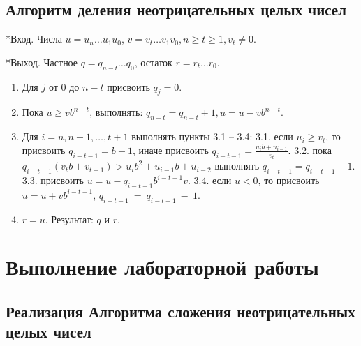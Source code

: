 \documentclass[
  english,
  russian,
  12pt,
  a4paper,
  DIV=11,
  numbers=noendperiod]{scrreprt}
\providecommand{\tightlist}{%
  \setlength{\itemsep}{0pt}\setlength{\parskip}{0pt}}
\begin{document}
\section{Алгоритм деления неотрицательных целых
чисел}\label{ux430ux43bux433ux43eux440ux438ux442ux43c-ux434ux435ux43bux435ux43dux438ux44f-ux43dux435ux43eux442ux440ux438ux446ux430ux442ux435ux43bux44cux43dux44bux445-ux446ux435ux43bux44bux445-ux447ux438ux441ux435ux43b}

*Вход. Числа \(u = u_n \ldots u_1 u_0\),
\(v = v_t \ldots v_1 v_0, n \ge t \ge 1, v_t \ne 0\).

*Выход. Частное \(q = q_{n-t} \ldots q_0\), остаток
\(r = r_t \ldots r_0\).

\begin{enumerate}
\def\labelenumi{\arabic{enumi}.}
\tightlist
\item
  Для \(j\) от \(0\) до \(n - t\) присвоить \(q_j = 0\).
\item
  Пока \(u \ge v b^{n - t}\), выполнять:
  \(q_{n - t} = q_{n - t} + 1, u = u - v b^{n - t}\).
\item
  Для \(i = n, n - 1, \ldots, t + 1\) выполнять пункты 3.1 -- 3.4: 3.1.
  если \(u_i \ge v_t\), то присвоить \(q_{i - t - 1} = b - 1\), иначе
  присвоить \(q_{i - t - 1} = \frac{u_i b + u_{i - 1}}{v_t}\). 3.2. пока
  \(q_{i - t - 1} (v_t b + v_{t - 1}) > u_i b^2 + u_{i - 1} b + u_{i - 2}\)
  выполнять \(q_{i - t - 1} = q_{i - t - 1} - 1\). 3.3. присвоить
  \(u = u - q_{i - t - 1} b^{i - t - 1} v\). 3.4. если \(u < 0\), то
  присвоить \(u = u + v b^{i - t - 1}\),
  \(q_{i - t - 1}~=~q_{i - t - 1}~-~1\).
\item
  \(r = u\). Результат: \(q\) и \(r\).
\end{enumerate}

\chapter{Выполнение лабораторной
работы}\label{ux432ux44bux43fux43eux43bux43dux435ux43dux438ux435-ux43bux430ux431ux43eux440ux430ux442ux43eux440ux43dux43eux439-ux440ux430ux431ux43eux442ux44b}

\section{Реализация Алгоритма сложения неотрицательных целых
чисел}\label{ux440ux435ux430ux43bux438ux437ux430ux446ux438ux44f-ux430ux43bux433ux43eux440ux438ux442ux43cux430-ux441ux43bux43eux436ux435ux43dux438ux44f-ux43dux435ux43eux442ux440ux438ux446ux430ux442ux435ux43bux44cux43dux44bux445-ux446ux435ux43bux44bux445-ux447ux438ux441ux435ux43b}
\end{document}
